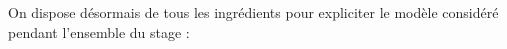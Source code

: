 On dispose désormais de tous les ingrédients pour expliciter le modèle considéré pendant l'ensemble du stage :





